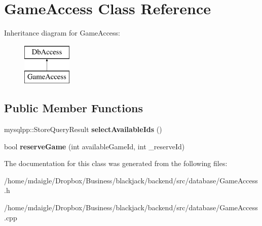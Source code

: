 \hypertarget{classGameAccess}{
\section{\-Game\-Access \-Class \-Reference}
\label{d3/d8a/classGameAccess}
}
\-Inheritance diagram for \-Game\-Access\-:\begin{figure}[H]
\begin{center}
\leavevmode
\includegraphics[height=2.000000cm]{d3/d8a/classGameAccess}
\end{center}
\end{figure}
\subsection*{\-Public \-Member \-Functions}
\begin{DoxyCompactItemize}
\item 
\hypertarget{classGameAccess_abd38c6664e2c64a22fdb34f075a0eb91}{
mysqlpp\-::\-Store\-Query\-Result {\bfseries select\-Available\-Ids} ()}
\label{d3/d8a/classGameAccess_abd38c6664e2c64a22fdb34f075a0eb91}

\item 
\hypertarget{classGameAccess_a4ee316f92dac85e7e25596aaeaf92c82}{
bool {\bfseries reserve\-Game} (int available\-Game\-Id, int \-\_\-reserve\-Id)}
\label{d3/d8a/classGameAccess_a4ee316f92dac85e7e25596aaeaf92c82}

\end{DoxyCompactItemize}


\-The documentation for this class was generated from the following files\-:\begin{DoxyCompactItemize}
\item 
/home/mdaigle/\-Dropbox/\-Business/blackjack/backend/src/database/\-Game\-Access.\-h\item 
/home/mdaigle/\-Dropbox/\-Business/blackjack/backend/src/database/\-Game\-Access.\-cpp\end{DoxyCompactItemize}
